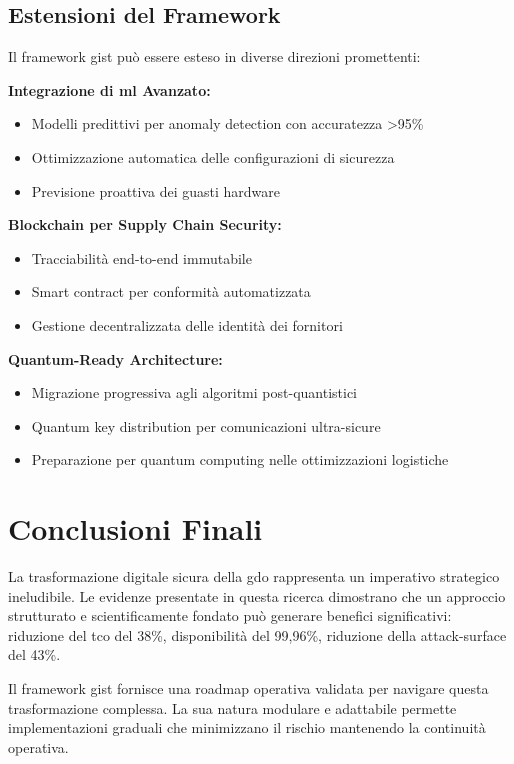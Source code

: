 \subsection{\texorpdfstring{Estensioni del Framework}{5.7.2 - Estensioni del Framework}}
\label{subsec:5.7.2}

Il framework \gls{gist} può essere esteso in diverse direzioni promettenti:

\textbf{Integrazione di \gls{ml} Avanzato:}
\begin{itemize}
\item Modelli predittivi per anomaly detection con accuratezza >95\%
\item Ottimizzazione automatica delle configurazioni di sicurezza
\item Previsione proattiva dei guasti hardware
\end{itemize}

\textbf{Blockchain per Supply Chain Security:}
\begin{itemize}
\item Tracciabilità end-to-end immutabile
\item Smart contract per conformità automatizzata
\item Gestione decentralizzata delle identità dei fornitori
\end{itemize}

\textbf{Quantum-Ready Architecture:}
\begin{itemize}
\item Migrazione progressiva agli algoritmi post-quantistici
\item Quantum key distribution per comunicazioni ultra-sicure
\item Preparazione per quantum computing nelle ottimizzazioni logistiche
\end{itemize}

\section{\texorpdfstring{Conclusioni Finali}{5.8 - Conclusioni Finali}}
\label{sec:5.8}

La trasformazione digitale sicura della \gls{gdo} rappresenta un imperativo strategico ineludibile. Le evidenze presentate in questa ricerca dimostrano che un approccio strutturato e scientificamente fondato può generare benefici significativi: riduzione del \gls{tco} del 38\%, disponibilità del 99,96\%, riduzione della \gls{attack-surface} del 43\%.

Il framework \gls{gist} fornisce una roadmap operativa validata per navigare questa trasformazione complessa. La sua natura modulare e adattabile permette implementazioni graduali che minimizzano il rischio mantenendo la continuità operativa.

